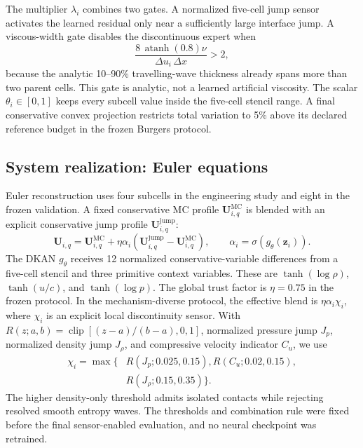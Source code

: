\documentclass[10pt,twocolumn]{article}
\begin{document}
The multiplier $\lambda_i$ combines two gates. A normalized five-cell jump sensor activates the learned residual only near a sufficiently large interface jump. A viscous-width gate disables the discontinuous expert when
\begin{equation}
 \frac{8\,\operatorname{atanh}(0.8)\nu}{\Delta u_i\,\Delta x}>2,
 \label{eq:viscousgate}
\end{equation}
because the analytic 10--90\% travelling-wave thickness already spans more than two parent cells. This gate is analytic, not a learned artificial viscosity. The scalar $\theta_i\in[0,1]$ keeps every subcell value inside the five-cell stencil range. A final conservative convex projection restricts total variation to 5\% above its declared reference budget in the frozen Burgers protocol.

\subsection{System realization: Euler equations}

Euler reconstruction uses four subcells in the engineering study and eight in the frozen validation. A fixed conservative MC profile $\bm U^{\mathrm{MC}}_{i,q}$ is blended with an explicit conservative jump profile $\bm U^{\mathrm{jump}}_{i,q}$:
\begin{equation}
 \bm U_{i,q}=\bm U^{\mathrm{MC}}_{i,q}
 +\eta\alpha_i\left(\bm U^{\mathrm{jump}}_{i,q}-\bm U^{\mathrm{MC}}_{i,q}\right),
 \qquad \alpha_i=\sigma\!\left(g_{\theta}(\bm z_i)\right).
 \label{eq:eulerblend}
\end{equation}
The DKAN $g_{\theta}$ receives 12 normalized conservative-variable differences from a five-cell stencil and three primitive context variables. These are $\tanh(\log\rho)$, $\tanh(u/c)$, and $\tanh(\log p)$. The global trust factor is $\eta=0.75$ in the frozen protocol. In the mechanism-diverse protocol, the effective blend is $\eta\alpha_i\chi_i$, where $\chi_i$ is an explicit local discontinuity sensor. With $R(z;a,b)=\operatorname{clip}[(z-a)/(b-a),0,1]$, normalized pressure jump $J_p$, normalized density jump $J_\rho$, and compressive velocity indicator $C_u$, we use
\begin{equation}
\begin{aligned}
 \chi_i=\max\!\bigl\{&R(J_p;0.025,0.15),
 R(C_u;0.02,0.15),\\
 &R(J_\rho;0.15,0.35)\bigr\}.
\end{aligned}
 \label{eq:eulersensor}
\end{equation}
The higher density-only threshold admits isolated contacts while rejecting resolved smooth entropy waves. The thresholds and combination rule were fixed before the final sensor-enabled evaluation, and no neural checkpoint was retrained.
\end{document}
